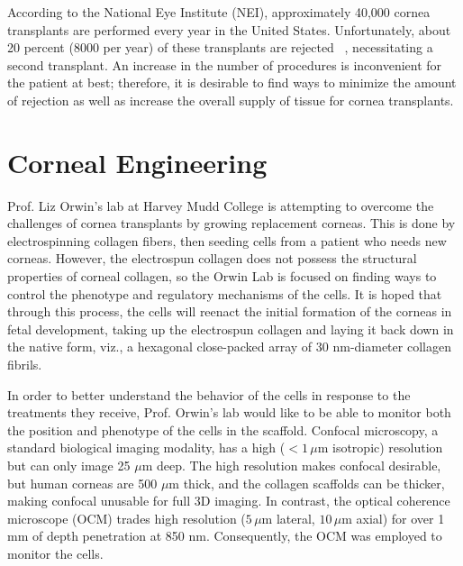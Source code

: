 According to the National Eye Institute (NEI), approximately 40,000 cornea transplants are performed every year in the United States. Unfortunately, about 20 percent (8000 per year) of these transplants are rejected ~\citep{NEI}, necessitating a second transplant. An increase in the number of procedures is inconvenient for the patient at best; therefore, it is desirable to find ways to minimize the amount of rejection as well as increase the overall supply of tissue for cornea transplants.

\section{Corneal Engineering}
\label{cornealengineering}

Prof. Liz Orwin's lab at Harvey Mudd College is attempting to overcome the challenges of cornea transplants by growing replacement corneas. This is done by electrospinning collagen fibers, then seeding cells from a patient who needs new corneas. However, the electrospun collagen does not possess the structural properties of corneal collagen, so the Orwin Lab is focused on finding ways to control the phenotype and regulatory mechanisms of the cells. It is hoped that through this process, the cells will reenact the initial formation of the corneas in fetal development, taking up the electrospun collagen and laying it back down in the native form, viz., a hexagonal close-packed array of 30 nm-diameter collagen fibrils.

In order to better understand the behavior of the cells in response to the treatments they receive, Prof. Orwin's lab would like to be able to monitor both the position and phenotype of the cells in the scaffold. Confocal microscopy, a standard biological imaging modality, has a high ($<1\,\mu$m isotropic) resolution but can only image 25 $\mu$m deep. The high resolution makes confocal desirable, but human corneas are 500 $\mu$m thick, and the collagen scaffolds can be thicker, making confocal unusable for full 3D imaging. In contrast, the optical coherence microscope (OCM) trades high resolution ($5\,\mu$m lateral, $10\,\mu$m axial) for over 1 mm of depth penetration at 850 nm. Consequently, the OCM was employed to monitor the cells.

